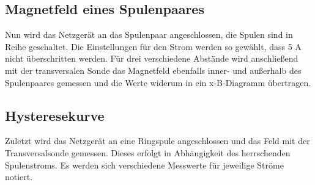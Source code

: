 \documentclass[11pt]{article}
\begin{document}
\subsection{Magnetfeld eines Spulenpaares}
Nun wird das Netzgerät an das Spulenpaar angeschlossen, die Spulen sind in Reihe geschaltet.
Die Einstellungen für den Strom werden so gewählt, dass 5 A nicht überschritten werden.
Für drei verschiedene Abstände wird anschließend mit der transversalen Sonde das Magnetfeld ebenfalls inner- und
außerhalb des Spulenpaares gemessen und die Werte widerum in ein x-B-Diagramm übertragen.
\subsection{Hysteresekurve}
Zuletzt wird das Netzgerät an eine Ringspule angeschlossen und das Feld mit der Transversalsonde gemessen.
Dieses erfolgt in Abhängigkeit des herrschenden Spulenstroms.
Es werden sich verschiedene Messwerte für jeweilige Ströme notiert.
\end{document}
